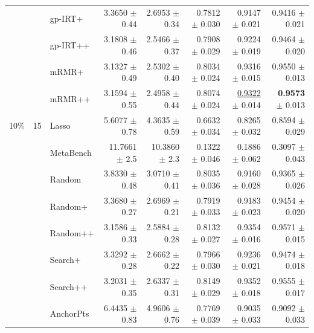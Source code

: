 \begin{longtable}{llp{}rrrrr}
 &  & gp-IRT+ & 3.3650 {\scriptsize $\pm$ 0.44} & 2.6953 {\scriptsize $\pm$ 0.34} & 0.7812 {\scriptsize $\pm$ 0.030} & 0.9147 {\scriptsize $\pm$ 0.021} & 0.9416 {\scriptsize $\pm$ 0.021} \\
 &  & gp-IRT++ & 3.1808 {\scriptsize $\pm$ 0.46} & 2.5466 {\scriptsize $\pm$ 0.37} & 0.7908 {\scriptsize $\pm$ 0.029} & 0.9224 {\scriptsize $\pm$ 0.019} & 0.9464 {\scriptsize $\pm$ 0.020} \\
 &  & mRMR+ & 3.1327 {\scriptsize $\pm$ 0.49} & 2.5302 {\scriptsize $\pm$ 0.40} & 0.8034 {\scriptsize $\pm$ 0.024} & 0.9316 {\scriptsize $\pm$ 0.015} & 0.9550 {\scriptsize $\pm$ 0.013} \\
 &  & mRMR++ & 3.1594 {\scriptsize $\pm$ 0.55} & 2.4958 {\scriptsize $\pm$ 0.44} & 0.8074 {\scriptsize $\pm$ 0.024} & \underline{0.9322} {\scriptsize $\pm$ 0.014} & \textbf{0.9573} {\scriptsize $\pm$ 0.013} \\
\midrule
10\% & 15 & Lasso & 5.6077 {\scriptsize $\pm$ 0.78} & 4.3635 {\scriptsize $\pm$ 0.59} & 0.6632 {\scriptsize $\pm$ 0.034} & 0.8265 {\scriptsize $\pm$ 0.032} & 0.8594 {\scriptsize $\pm$ 0.029} \\
 &  & MetaBench & 11.7661 {\scriptsize $\pm$ 2.5} & 10.3860 {\scriptsize $\pm$ 2.3} & 0.1322 {\scriptsize $\pm$ 0.046} & 0.1886 {\scriptsize $\pm$ 0.062} & 0.3097 {\scriptsize $\pm$ 0.043} \\
 &  & Random & 3.8330 {\scriptsize $\pm$ 0.48} & 3.0710 {\scriptsize $\pm$ 0.41} & 0.8035 {\scriptsize $\pm$ 0.036} & 0.9160 {\scriptsize $\pm$ 0.028} & 0.9365 {\scriptsize $\pm$ 0.026} \\
 &  & Random+ & 3.3680 {\scriptsize $\pm$ 0.27} & 2.6969 {\scriptsize $\pm$ 0.21} & 0.7919 {\scriptsize $\pm$ 0.033} & 0.9183 {\scriptsize $\pm$ 0.023} & 0.9454 {\scriptsize $\pm$ 0.020} \\
 &  & Random++ & 3.1586 {\scriptsize $\pm$ 0.33} & 2.5884 {\scriptsize $\pm$ 0.28} & 0.8132 {\scriptsize $\pm$ 0.027} & 0.9354 {\scriptsize $\pm$ 0.016} & 0.9571 {\scriptsize $\pm$ 0.015} \\
 &  & Search+ & 3.3292 {\scriptsize $\pm$ 0.28} & 2.6662 {\scriptsize $\pm$ 0.22} & 0.7966 {\scriptsize $\pm$ 0.030} & 0.9236 {\scriptsize $\pm$ 0.021} & 0.9474 {\scriptsize $\pm$ 0.018} \\
 &  & Search++ & 3.2031 {\scriptsize $\pm$ 0.35} & 2.6337 {\scriptsize $\pm$ 0.31} & 0.8149 {\scriptsize $\pm$ 0.029} & 0.9352 {\scriptsize $\pm$ 0.018} & 0.9555 {\scriptsize $\pm$ 0.017} \\
 &  & AnchorPts & 6.4435 {\scriptsize $\pm$ 0.83} & 4.9606 {\scriptsize $\pm$ 0.76} & 0.7769 {\scriptsize $\pm$ 0.039} & 0.9035 {\scriptsize $\pm$ 0.033} & 0.9092 {\scriptsize $\pm$ 0.033} \\

\end{longtable}
